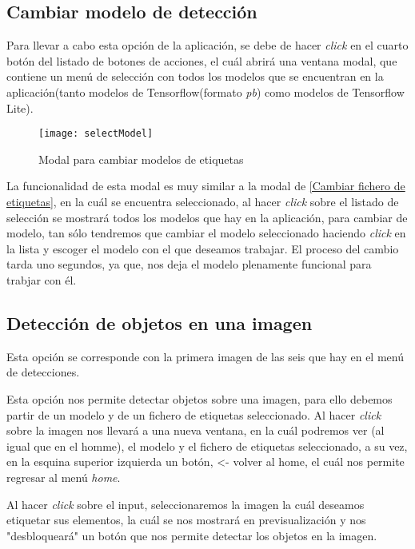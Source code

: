 \subsection{Cambiar modelo de detección}
Para llevar a cabo esta opción de la aplicación, se debe de hacer \textit{click} en el cuarto botón del listado de botones de acciones, el cuál abrirá una ventana modal, que contiene un menú de selección con todos los modelos que se encuentran en la aplicación(tanto modelos de Tensorflow(formato \textit{pb}) como modelos de Tensorflow Lite).

\begin{figure}[!h]
    \centering
    \texttt{[image: selectModel]}
    \caption{Modal para cambiar modelos de etiquetas}\label{fig:selectModel}
\end{figure}

La funcionalidad de esta modal es muy similar a la modal de \ref{Cambiar fichero de etiquetas}, en la cuál se encuentra seleccionado, al hacer \textit{click} sobre el listado de selección se mostrará todos los modelos que hay en la aplicación, para cambiar de modelo, tan sólo tendremos que cambiar el modelo seleccionado haciendo \textit{click} en la lista y escoger el modelo con el que deseamos trabajar.
El proceso del cambio tarda uno segundos, ya que, nos deja el modelo plenamente funcional para trabjar con él.

\subsection{Detección de objetos en una imagen} \label{od_img}
Esta opción se corresponde con la primera imagen de las seis que hay en el menú de detecciones.


Esta opción nos permite detectar objetos sobre una imagen, para ello debemos partir de un modelo y de un fichero de etiquetas seleccionado.
Al hacer \textit{click} sobre la imagen nos llevará a una nueva ventana, en la cuál podremos ver (al igual que en el homme), el modelo y el fichero de etiquetas seleccionado, 
a su vez, en la esquina superior izquierda un botón, <- volver al home, el cuál nos permite regresar al menú \textit{home}.


Al hacer \textit{click} sobre el input, seleccionaremos la imagen la cuál deseamos etiquetar sus elementos, la cuál se nos mostrará en previsualización y nos "desbloqueará" un botón que nos permite detectar los objetos en la imagen.

